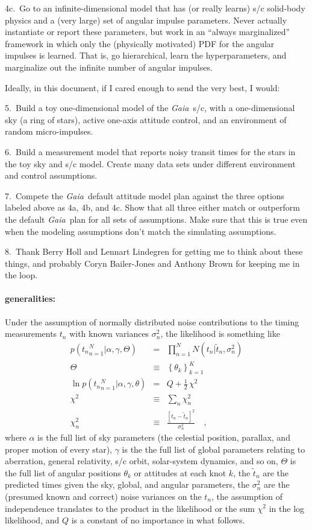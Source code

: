 \documentclass[12pt]{article}
\newcommand{\project}[1]{\textsl{#1}}
\newcommand{\gaia}{\project{Gaia}}
\begin{document}
4c.~Go to an infinite-dimensional model that has (or really learns)
s/c solid-body physics and a (very large) set of angular impulse
parameters.  Never actually instantiate or report these parameters,
but work in an ``always marginalized'' framework in which only the
(physically motivated) PDF for the angular impulses is learned.  That
is, go hierarchical, learn the hyperparameters, and marginalize out
the infinite number of angular impulses.

Ideally, in this document, if I cared enough to send the very best, I
would:

5.~Build a toy one-dimensional model of the \gaia\ s/c, with a
one-dimensional sky (a ring of stars), active one-axis attitude
control, and an environment of random micro-impulses.

6.~Build a measurement model that reports noisy transit times for the
stars in the toy sky and s/c model.  Create many data sets under
different environment and control assumptions.

7.~Compete the \gaia\ default attitude model plan against the three
options labeled above as 4a, 4b, and 4c.  Show that all three either
match or outperform the default \gaia\ plan for all sets of
assumptions.  Make sure that this is true even when the modeling
assumptions don't match the simulating assumptions.

8.~Thank Berry Holl and Lennart Lindegren for getting me to think
about these things, and probably Coryn Bailer-Jones and Anthony Brown
for keeping me in the loop.

\paragraph{generalities:}
Under the assumption of normally distributed noise contributions to
the timing measurements $t_n$ with known variances $\sigma^2_n$, the
likelihood is something like
\begin{eqnarray}\displaystyle
p({t_n}_{n=1}^N|\alpha,\gamma,\Theta) &=& \prod_{n=1}^N N(t_n|\tilde{t}_n, \sigma^2_n)
\\
\Theta &\equiv& \left\{\theta_k \right\}_{k=1}^K
\\
\ln p({t_n}_{n=1}^N|\alpha,\gamma,\theta) &=& Q + \frac{1}{2}\,\chi^2
\\
\chi^2 &\equiv& \sum_n \chi^2_n
\\
\chi^2_n &\equiv& \frac{[t_n - \tilde{t}_n]^2}{\sigma^2_n}
\quad ,
\end{eqnarray}
where $\alpha$ is the full list of sky parameters (the celestial
position, parallax, and proper motion of every star), $\gamma$ is the
the full list of global parameters relating to aberration, general
relativity, s/c orbit, solar-system dynamics, and so on, $\Theta$ is
the full list of angular positions $\theta_k$ or attitudes at each
knot $k$, the $\tilde{t}_n$ are the predicted times given the sky,
global, and angular parameters, the $\sigma^2_n$ are the (presumed
known and correct) noise variances on the $t_n$, the assumption of
independence translates to the product in the likelihood or the sum
$\chi^2$ in the log likelihood, and $Q$ is a constant of no importance
in what follows.
\end{document}
